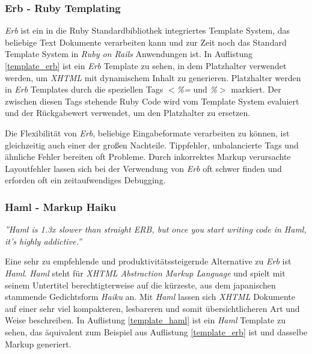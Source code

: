 \subsubsection{Erb - Ruby Templating}

\textit{Erb} ist ein in die Ruby Standardbibliothek integriertes
Template System, das beliebige Text Dokumente verarbeiten kann und zur
Zeit noch das Standard Template System in \textit{Ruby on Rails}
Anwendungen ist. In Auflistung \ref{template_erb} ist ein \textit{Erb}
Template zu sehen, in dem Platzhalter verwendet werden, um
\textit{XHTML}  mit dynamischem Inhalt zu generieren. Platzhalter werden
in \textit{Erb} Templates durch die speziellen Tags \textit{$<$\%=}
und \textit{\%$>$} markiert. Der zwischen diesen Tags stehende Ruby
Code wird vom Template System evaluiert und der Rückgabe\-wert
verwendet, um den Platzhalter zu ersetzen.



Die Flexibilität von \textit{Erb}, beliebige Eingabeformate
verarbeiten zu können, ist gleichzeitig auch einer der großen
Nachteile. Tippfehler, unbalancierte Tags und ähnliche Fehler bereiten
oft Probleme. Durch inkorrektes Markup verursachte Layoutfehler lassen
sich bei der Verwendung von \textit{Erb} oft schwer finden und
erforden oft ein zeitaufwendiges Debugging.

\subsubsection{Haml - Markup Haiku}

\textit{''Haml is 1.3x slower than straight ERB, but once you start
  writing code in Haml, it’s highly addictive.''}

Eine sehr zu empfehlende und produktivitätssteigernde Alternative zu
\textit{Erb} ist \textit{Haml}. \textit{Haml} steht für \textit{XHTML
  Abstraction Markup Language} und spielt mit seinem Untertitel
berechtigterweise auf die kürzeste, aus dem japanischen stammende
Gedichtsform \textit{Haiku} an. Mit \textit{Haml} lassen sich
\textit{XHTML} Dokumente auf einer sehr viel kompakteren, lesbareren
und somit übersichtlicheren Art und Weise beschreiben. In Auflistung
\ref{template_haml} ist ein \textit{Haml} Template zu sehen, das
äquivalent zum Beispiel aus Auflistung \ref{template_erb} ist und
dasselbe Markup generiert.

